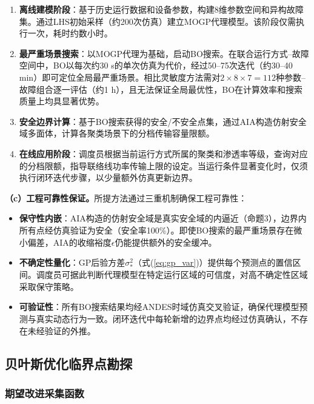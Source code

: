 \begin{enumerate}
    \item \textbf{离线建模阶段}：基于历史运行数据和设备参数，构建8维参数空间和异构故障集。通过LHS初始采样（约200次仿真）建立MOGP代理模型。该阶段仅需执行一次，耗时约数小时。
    \item \textbf{最严重场景搜索}：以MOGP代理为基础，启动BO搜索。在联合运行方式--故障空间中，BO以每次约30 s的单次仿真为代价，经过50--75次迭代（约30--40 min）即可定位全局最严重场景。相比灵敏度方法需对$2 \times 8 \times 7 = 112$种参数--故障组合逐一评估（约1 h），且无法保证全局最优性，BO在计算效率和搜索质量上均具显著优势。
    \item \textbf{安全边界计算}：基于BO搜索获得的安全/不安全点集，通过AIA构造仿射安全域多面体，计算各聚类场景下的分档传输容量限额。
    \item \textbf{在线应用阶段}：调度员根据当前运行方式所属的聚类和渗透率等级，查询对应的分档限额，指导联络线功率传输上限的设定。当运行条件显著变化时，仅须执行闭环迭代步骤，以少量额外仿真更新边界。
\end{enumerate}

\textbf{（c）工程可靠性保证。}所提方法通过三重机制确保工程可靠性：

\begin{itemize}
    \item \textbf{保守性内嵌}：AIA构造的仿射安全域是真实安全域的内逼近（命题3），边界内所有点经仿真验证为安全（安全率100\%）。即使BO搜索的最严重场景存在微小偏差，AIA的收缩裕度$\epsilon$仍能提供额外的安全缓冲。
    \item \textbf{不确定性量化}：GP后验方差$\sigma_*^2$（式(\ref{eq:gp_var})）提供每个预测点的置信区间。调度员可据此判断代理模型在特定运行区域的可信度，对高不确定性区域采取保守策略。
    \item \textbf{可验证性}：所有BO搜索结果均经ANDES时域仿真交叉验证，确保代理模型预测与真实动态行为一致。闭环迭代中每轮新增的边界点均经过仿真确认，不存在未经验证的外推。
\end{itemize}

\subsection{贝叶斯优化临界点勘探}
\label{subsec:bo}

\subsubsection{期望改进采集函数}

